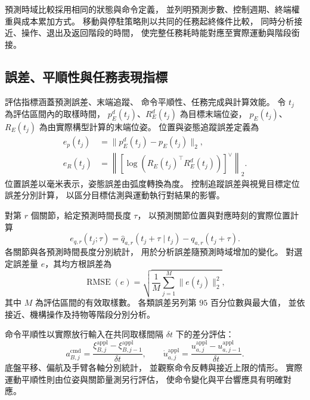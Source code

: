 預測時域比較採用相同的狀態與命令定義，
並列明預測步數、控制週期、終端權重與成本累加方式。
移動與停駐策略則以共同的任務起終條件比較，
同時分析接近、操作、退出及返回階段的時間，
使完整任務耗時能對應至實際運動與階段銜接。

\subsection{誤差、平順性與任務表現指標}
\label{subsec:tracking_smoothness_task_metrics}

評估指標涵蓋預測誤差、末端追蹤、
命令平順性、任務完成與計算效能。
令 $t_j$ 為評估區間內的取樣時間，
$p_E^d(t_j)$、$R_E^d(t_j)$ 為目標末端位姿，
$p_E(t_j)$、$R_E(t_j)$ 為由實際構型計算的末端位姿。
位置與姿態追蹤誤差定義為
\begin{equation}
    \begin{aligned}
        e_p(t_j)
        &=\|p_E^d(t_j)-p_E(t_j)\|_2,\\
        e_R(t_j)
        &=\left\|
        \left[\log\!\left(R_E(t_j)^\top R_E^d(t_j)\right)\right]^\vee
        \right\|_2.
    \end{aligned}
    \label{eq:ch4_tcp_tracking_metrics}
\end{equation}
位置誤差以毫米表示，姿態誤差由弧度轉換為度。
控制追蹤誤差與視覺目標定位誤差分別計算，
以區分目標估測與運動執行對結果的影響。

對第 $r$ 個關節，給定預測時間長度 $\tau$，
以預測關節位置與對應時刻的實際位置計算
\begin{equation}
    e_{q,r}(t_j;\tau)
    =\hat q_{a,r}(t_j+\tau\mid t_j)-q_{a,r}(t_j+\tau).
    \label{eq:ch4_joint_prediction_error}
\end{equation}
各關節與各預測時間長度分別統計，
用於分析誤差隨預測時域增加的變化。
對選定誤差量 $e$，其均方根誤差為
\begin{equation}
    \operatorname{RMSE}(e)
    =\sqrt{\frac{1}{M}\sum_{j=1}^{M}\|e(t_j)\|_2^2},
    \label{eq:ch4_rmse}
\end{equation}
其中 $M$ 為評估區間的有效取樣數。
各類誤差另列第 $95$ 百分位數與最大值，
並依接近、機構操作及持物等階段分別分析。

命令平順性以實際放行輸入在共同取樣間隔 $\delta t$ 下的差分評估：
\begin{equation}
    a_{B,j}^{\mathrm{cmd}}
    =\frac{\xi_{B,j}^{\mathrm{appl}}-\xi_{B,j-1}^{\mathrm{appl}}}{\delta t},
    \qquad
    \dot u_{a,j}^{\mathrm{appl}}
    =\frac{u_{a,j}^{\mathrm{appl}}-u_{a,j-1}^{\mathrm{appl}}}{\delta t}.
    \label{eq:ch4_applied_command_variation}
\end{equation}
底盤平移、偏航及手臂各軸分別統計，
並觀察命令反轉與接近上限的情形。
實際運動平順性則由位姿與關節量測另行評估，
使命令變化與平台響應具有明確對應。

